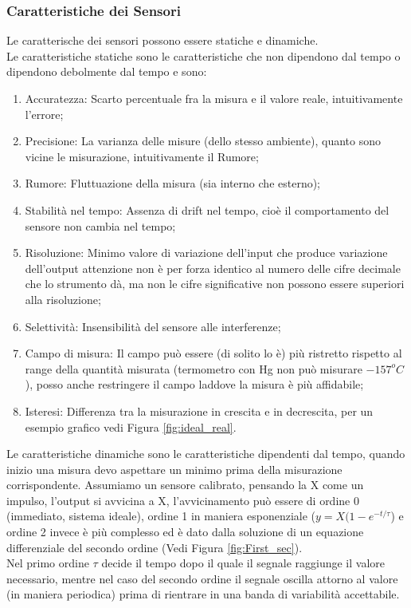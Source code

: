 \documentclass[11pt, twocolumn]{article}
\newenvironment{myenumerate}
{ \begin{enumerate}[topsep=0ex]
		\setlength{\itemsep}{0pt}
		\setlength{\parskip}{0pt}
		\setlength{\parsep}{0pt}     }
	{ \end{enumerate}                  }
\begin{document}
\subsubsection{Caratteristiche dei Sensori}
Le caratterische dei sensori possono essere statiche e dinamiche.\\
Le caratteristiche statiche sono le caratteristiche che non dipendono dal tempo o dipendono debolmente dal tempo e sono:
\begin{myenumerate}
  \item Accuratezza: Scarto percentuale fra la misura e il valore reale, intuitivamente l'errore;
  \item Precisione: La varianza delle misure (dello stesso ambiente), quanto sono vicine le misurazione, intuitivamente il Rumore;
  \item Rumore: Fluttuazione della misura (sia interno che esterno);
  \item Stabilità nel tempo: Assenza di drift nel tempo, cioè il comportamento del sensore non cambia nel tempo; 
  \item Risoluzione: Minimo valore di variazione dell'input che produce variazione dell'output attenzione non è per forza identico al numero delle cifre decimale che lo strumento dà, ma non le cifre significative non possono essere superiori alla risoluzione; 
  \item Selettività: Insensibilità del sensore alle interferenze;
  \item Campo di misura: Il campo può essere (di solito lo è) più ristretto rispetto al range della quantità misurata (termometro con Hg non può misurare $-157^oC$), posso anche restringere il campo laddove la misura è più affidabile;
  \item Isteresi: Differenza tra la misurazione in crescita e in decrescita, per un esempio grafico vedi Figura \ref{fig:ideal_real}.
\end{myenumerate}
Le caratteristiche dinamiche sono le caratteristiche dipendenti dal tempo, quando inizio una misura devo aspettare un minimo prima della misurazione corrispondente.
Assumiamo un sensore calibrato, pensando la X come un impulso, l'output si avvicina a X, l'avvicinamento può essere di ordine 0 (immediato, sistema ideale), ordine 1 in maniera esponenziale ($y=X(1-e^{-t/\tau}$) e ordine 2 invece è più complesso ed è dato dalla soluzione di un equazione differenziale del secondo ordine (Vedi Figura \ref{fig:First_sec}).\\
Nel primo ordine $\tau$ decide il tempo dopo il quale il segnale raggiunge il valore necessario, mentre nel caso del secondo ordine il segnale oscilla attorno al valore (in maniera periodica) prima di rientrare in una banda di variabilità accettabile.
\end{document}
